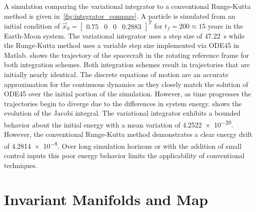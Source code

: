 \documentclass[preprint]{elsarticle}
\begin{document}
A simulation comparing the variational integrator to a conventional Runge-Kutta method is given in~\cref{fig:integrator_compare}.
A particle is simulated from an initial condition of \( \vec{x}_0 = \begin{bmatrix} 0.75 & 0 & 0 & 0.2883\end{bmatrix}^T \) for \( t_f = 200 \approx 15\) years in the Earth-Moon system.
The variational integrator uses a step size of \SI{47.22}{\second} while the Runge-Kutta method uses a variable step size implemented via ODE45 in Matlab.
 shows the trajectory of the spacecraft in the rotating reference frame for both integration schemes.
Both integration schemes result in trajectories that are initially nearly identical.
The discrete equations of motion are an accurate approximation for the continuous dynamics as they closely match the solution of ODE45 over the initial portion of the simulation.
However, as time progresses the trajectories begin to diverge due to the differences in system energy.
 shows the evolution of the Jacobi integral.
The variational integrator exhibits a bounded behavior about the initial energy with a mean variation of \num{4.2522e-20}.
However, the conventional Runge-Kutta method demonstrates a clear energy drift of \num{4.2814e-8}. 
Over long simulation horizons or with the addition of small control inputs this poor energy behavior limits the applicability of conventional techniques.

\section{Invariant Manifolds and \Poincare Map} 

\end{document}
